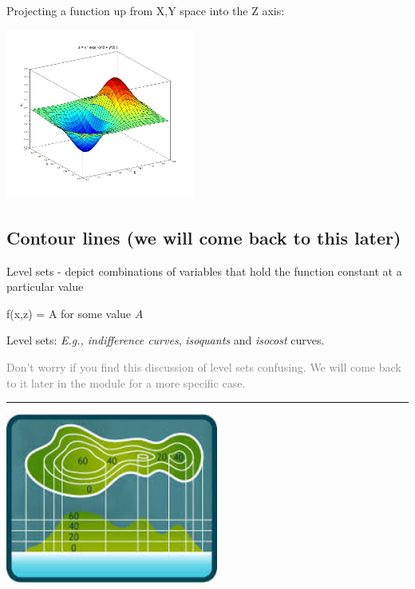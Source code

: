 \documentclass[]{article}
\providecommand{\tightlist}{%
  \setlength{\itemsep}{0pt}\setlength{\parskip}{0pt}}
\begin{document}
Projecting a function up from X,Y space into the Z axis:

\includegraphics[height=2.2in]{picsfigs/doubledip.jpg}

\hypertarget{contour-lines-we-will-come-back-to-this-later}{%
\subsection{Contour lines (we will come back to this later)}\label{contour-lines-we-will-come-back-to-this-later}}

\begin{description}
\tightlist
\item[Contour lines]
Level sets - depict combinations of variables that hold the function constant at a particular value

f(x,z) = A for some value \(A\)
\end{description}

Level sets: \emph{E.g., indifference curves}, \emph{isoquants} and \emph{isocost} curves.

\textcolor{gray}{Don't worry if you find this discussion of level sets confusing. We will come back to it later in the module for a more specific case.}

\begin{center}\rule{0.5\linewidth}{\linethickness}\end{center}

\includegraphics[height=2.2in]{picsfigs/contourlines.jpeg}
\end{document}
